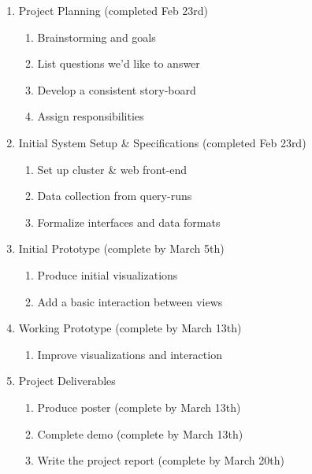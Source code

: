 \begin{enumerate}
    \item Project Planning (completed Feb 23rd)
    \begin{enumerate}
        \item Brainstorming and goals
        \item List questions we'd like to answer
        \item Develop a consistent story-board
        \item Assign responsibilities
    \end{enumerate}
    \item Initial System Setup \& Specifications (completed Feb 23rd)
    \begin{enumerate}
        \item Set up cluster \& web front-end
        \item Data collection from query-runs
        \item Formalize interfaces and data formats
    \end{enumerate}
    \item Initial Prototype (complete by March 5th)
    \begin{enumerate}
        \item Produce initial visualizations
        \item Add a basic interaction between views
    \end{enumerate}
    \item Working Prototype (complete by March 13th)
    \begin{enumerate}
        \item Improve visualizations and interaction
    \end{enumerate}
    \item Project Deliverables 
    \begin{enumerate}
        \item Produce poster (complete by March 13th)
        \item Complete demo (complete by March 13th)
        \item Write the project report (complete by March 20th)
    \end{enumerate}
    
\end{enumerate}





